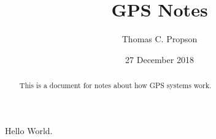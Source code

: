 \documentclass[12pt, letterpaper]{article}
\title{GPS Notes}
\author{Thomas C. Propson}
\date{27 December 2018}
\begin{document}
\begin{titlingpage}
  \maketitle
  \begin{abstract}
    This is a document for notes about how GPS systems work.
  \end{abstract}
\end{titlingpage}

Hello World.
\end{document}

